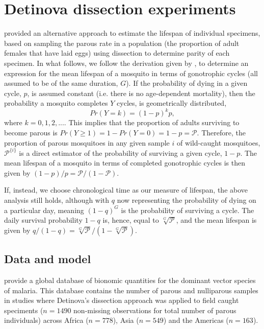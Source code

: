\documentclass[12pt]{article}
\begin{document}
{\section{Detinova dissection experiments}\label{sec:detinova}
\cite{detinova1962age} provided an alternative approach to estimate the lifespan of individual specimens, based on sampling the parous rate in a population (the proportion of adult females that have laid eggs) using dissection to determine parity of each specimen. In what follows, we follow the derivation given by \cite{davidson1954estimation}, to determine an expression for the mean lifespan of a mosquito in terms of gonotrophic cycles (all assumed to be of the same duration, $G$). If the probability of dying in a given cycle, $p$, is assumed constant (i.e. there is no age-dependent mortality), then the probability a mosquito completes $Y$ cycles, is geometrically distributed,
%
\begin{equation}
Pr(Y=k) = (1-p)^k p,
\end{equation}
%
where $k= 0,1,2,...$. This implies that the proportion of adults surviving to become parous is $Pr(Y\geq 1) = 1 - Pr(Y=0) = 1-p=\mathcal{P}$. Therefore, the proportion of parous mosquitoes in any given sample $i$ of wild-caught mosquitoes, $\mathcal{P}^{\{i\}}$ is a direct estimator of the probability of surviving a given cycle, $1-p$. The mean lifespan of a mosquito in terms of completed gonotrophic cycles is then given by $(1-p)/p= \mathcal{P}/(1-\mathcal{P})$.

If, instead, we choose chronological time as our measure of lifespan, the above analysis still holds, although with $q$ now representing the probability of dying on a particular day, meaning $(1-q)^G$ is the probability of surviving a cycle. The daily survival probability $1-q$ is, hence, equal to $\sqrt[G]{\mathcal{P}}$, and the mean lifespan is given by $q/(1-q)=\sqrt[G]{\mathcal{P}}/(1-\sqrt[G]{\mathcal{P}})$.

\subsection{Data and model}\label{sec:detinova_datamodel}
\cite{massey2016global} provide a global database of bionomic quantities for the dominant vector species of malaria. This database contains the number of parous and nulliparous samples in studies where Detinova's dissection approach was applied to field caught speciments ($n=1490$ non-missing observations for total number of parous individuals) across Africa ($n=778$), Asia ($n=549$) and the Americas ($n=163$). 

}
\end{document}
